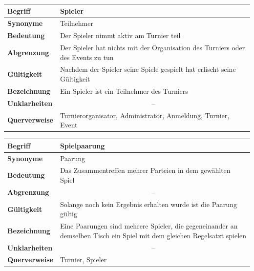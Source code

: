 \documentclass[11pt]{article}
\begin{document}
\begin{tabularx}{\textwidth}{| p{} | p{} |}
	\hline
	\textbf{Begriff} & Spieler\\
	\hline
	\textbf{Synonyme} & Teilnehmer \\
	\hline
	\textbf{Bedeutung} & Der Spieler nimmt aktiv am Turnier teil\\
	\hline
	\textbf{Abgrenzung} & Der Spieler hat nichts mit der Organisation des Turniers oder des Events zu tun\\
	\hline
	\textbf{Gültigkeit} & Nachdem der Spieler seine Spiele gespielt hat erlischt seine Gültigkeit\\
	\hline
	\textbf{Bezeichnung} & Ein Spieler ist ein Teilnehmer des Turniers\\
	\hline
	\textbf{Unklarheiten} & \multicolumn{1}{c|}{--} \\
	\hline
	\textbf{Querverweise} & Turnierorganisator, Administrator, Anmeldung, Turnier, Event \\
	\hline
\end{tabularx}
	
\begin{tabularx}{\textwidth}{| p{} | p{} |}
	\hline
	\textbf{Begriff} & Spielpaarung\\
	\hline
	\textbf{Synonyme} & Paarung\\
	\hline
	\textbf{Bedeutung} & Das Zusammentreffen mehrer Parteien in dem gewählten Spiel\\
	\hline
	\textbf{Abgrenzung} & \multicolumn{1}{c|}{--} \\
	\hline
	\textbf{Gültigkeit} & Solange noch kein Ergebnis erhalten wurde ist die Paarung gültig\\
	\hline
	\textbf{Bezeichnung} & Eine Paarungen sind mehrere Spieler, die gegeneinander an demselben Tisch ein Spiel mit dem gleichen Regelsatzt spielen\\
	\hline 
	\textbf{Unklarheiten} & \multicolumn{1}{c|}{--} \\
	\hline
	\textbf{Querverweise} &  Turnier, Spieler\\
	\hline
\end{tabularx}

\newpage
\end{document}
